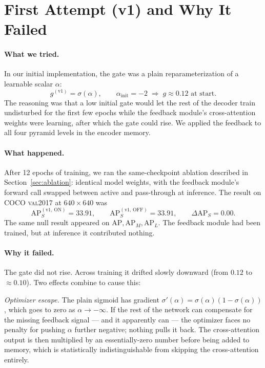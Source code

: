 \section{First Attempt (v1) and Why It Failed}
\label{sec:v1}

\paragraph{What we tried.} In our initial implementation, the gate was a plain reparameterization of a learnable scalar $\alpha$:
\begin{equation*}
    g^{(\text{v1})} = \sigma(\alpha), \qquad \alpha_{\mathrm{init}} = -2 \;\Rightarrow\; g \approx 0.12 \text{ at start}.
\end{equation*}
The reasoning was that a low initial gate would let the rest of the decoder train undisturbed for the first few epochs while the feedback module's cross-attention weights were learning, after which the gate could rise. We applied the feedback to all four pyramid levels in the encoder memory.

\paragraph{What happened.} After 12 epochs of training, we ran the same-checkpoint ablation described in Section~\ref{sec:ablation}: identical model weights, with the feedback module's forward call swapped between active and pass-through at inference. The result on COCO \textsc{val2017} at $640{\times}640$ was
\begin{equation*}
    \mathrm{AP}_S^{(\text{v1, ON})} = 33.91, \qquad \mathrm{AP}_S^{(\text{v1, OFF})} = 33.91, \qquad \Delta\mathrm{AP}_S = 0.00.
\end{equation*}
The same null result appeared on $\mathrm{AP}, \mathrm{AP}_M, \mathrm{AP}_L$. The feedback module had been trained, but at inference it contributed nothing.

\paragraph{Why it failed.} The gate did not rise. Across training it drifted slowly downward (from $0.12$ to ${\approx}0.10$). Two effects combine to cause this:

\emph{Optimizer escape.} The plain sigmoid has gradient $\sigma'(\alpha) = \sigma(\alpha)(1-\sigma(\alpha))$, which goes to zero as $\alpha \to -\infty$. If the rest of the network can compensate for the missing feedback signal --- and it apparently can --- the optimizer faces no penalty for pushing $\alpha$ further negative; nothing pulls it back. The cross-attention output is then multiplied by an essentially-zero number before being added to memory, which is statistically indistinguishable from skipping the cross-attention entirely.

